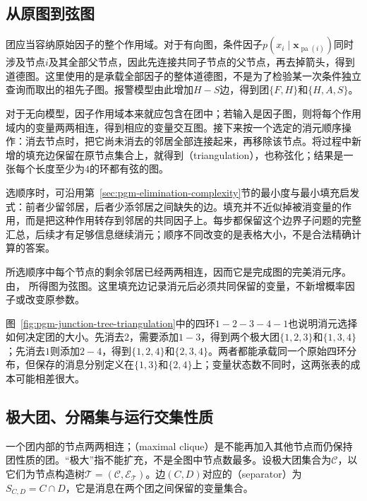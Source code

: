 \subsection{从原图到弦图}
\label{sec:pgm-junction-tree-chordalization}

团应当容纳原始因子的整个作用域。对于有向图，条件因子$p(x_i\mid\bm{x}_{\operatorname{pa}(i)})$同时涉及节点$i$及其全部父节点，因此先连接共同子节点的父节点，再去掉箭头，得到道德图。这里使用的是承载全部因子的整体道德图，不是为了检验某一次条件独立查询而取出的祖先子图。报警模型由此增加$H-S$边，得到团$\{F,H\}$和$\{H,A,S\}$。

对于无向模型，因子作用域本来就应包含在团中；若输入是因子图，则将每个作用域内的变量两两相连，得到相应的变量交互图。接下来按一个选定的消元顺序操作：消去节点时，把它尚未消去的邻居全部连接起来，再移除该节点。将过程中新增的填充边保留在原节点集合上，就得到（triangulation），也称弦化；结果是一张每个长度至少为$4$的环都有弦的图。

选顺序时，可沿用第~\ref{sec:pgm-elimination-complexity}节的最小度与最小填充启发式：前者少留邻居，后者少添邻居之间缺失的边。填充并不近似掉被消变量的作用，而是把这种作用转存到邻居的共同因子上。每步都保留这个边界子问题的完整汇总，后续才有足够信息继续消元；顺序不同改变的是表格大小，不是合法精确计算的答案。

所选顺序中每个节点的剩余邻居已经两两相连，因而它是完成图的完美消元序。
由，
所得图为弦图。这里填充边记录消元后必须共同保留的变量，不新增概率因子或改变原参数。

图~\ref{fig:pgm-junction-tree-triangulation}中的四环$1-2-3-4-1$也说明消元选择如何决定团的大小。先消去$2$，需要添加$1-3$，得到两个极大团$\{1,2,3\}$和$\{1,3,4\}$；先消去$1$则添加$2-4$，得到$\{1,2,4\}$和$\{2,3,4\}$。两者都能承载同一个原始四环分布，但保存的消息分别定义在$\{1,3\}$和$\{2,4\}$上；变量状态数不同时，这两张表的成本可能相差很大。

\subsection{极大团、分隔集与运行交集性质}
\label{sec:pgm-junction-tree-running-intersection}

一个团内部的节点两两相连；（maximal clique）是不能再加入其他节点而仍保持团性质的团。“极大”指不能扩充，不是全图中节点数最多。设极大团集合为$\mathcal{C}$，以它们为节点构造树$\mathcal{T}=(\mathcal{C},\mathcal{E}_{\mathcal{T}})$。边$(C,D)$对应的（separator）为$S_{C,D}=C\cap D$，它是消息在两个团之间保留的变量集合。


